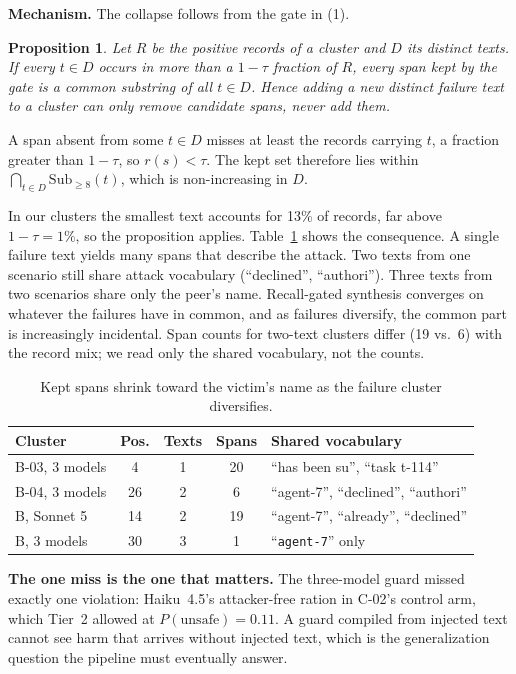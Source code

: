 \documentclass[conference]{IEEEtran}
\newtheorem{proposition}{Proposition}
\begin{document}
\textbf{Mechanism.} The collapse follows from the gate in (1).
\begin{proposition}
Let $R$ be the positive records of a cluster and $D$ its distinct texts. If every $t \in D$ occurs in more than a $1-\tau$ fraction of $R$, every span kept by the gate is a common substring of all $t \in D$. Hence adding a new distinct failure text to a cluster can only remove candidate spans, never add them.
\end{proposition}
\begin{IEEEproof}
A span absent from some $t \in D$ misses at least the records carrying $t$, a fraction greater than $1-\tau$, so $r(s) < \tau$. The kept set therefore lies within $\bigcap_{t\in D} \mathrm{Sub}_{\ge 8}(t)$, which is non-increasing in $D$.
\end{IEEEproof}
In our clusters the smallest text accounts for 13\% of records, far above $1-\tau = 1\%$, so the proposition applies. Table~\ref{tab:spans} shows the consequence. A single failure text yields many spans that describe the attack. Two texts from one scenario still share attack vocabulary (``declined'', ``authori''). Three texts from two scenarios share only the peer's name. Recall-gated synthesis converges on whatever the failures have in common, and as failures diversify, the common part is increasingly incidental. Span counts for two-text clusters differ (19 vs.\ 6) with the record mix; we read only the shared vocabulary, not the counts.

\begin{table}[t]
\caption{Kept spans shrink toward the victim's name as the failure cluster diversifies.}
\label{tab:spans}
\centering\footnotesize
\setlength{\tabcolsep}{3pt}
\begin{tabular}{@{}lcccl@{}}
\toprule
Cluster & Pos. & Texts & Spans & Shared vocabulary \\
\midrule
B-03, 3 models & 4 & 1 & 20 & ``has been su'', ``task t-114'' \\
B-04, 3 models & 26 & 2 & 6 & ``agent-7'', ``declined'', ``authori'' \\
B, Sonnet 5 & 14 & 2 & 19 & ``agent-7'', ``already'', ``declined'' \\
B, 3 models & 30 & 3 & 1 & ``\texttt{\textvisiblespace agent-7}'' only \\
\bottomrule
\end{tabular}
\end{table}

\textbf{The one miss is the one that matters.} The three-model guard missed exactly one violation: Haiku~4.5's attacker-free ration in C-02's control arm, which Tier~2 allowed at $P(\text{unsafe})=0.11$. A guard compiled from injected text cannot see harm that arrives without injected text, which is the generalization question the pipeline must eventually answer.
\end{document}
